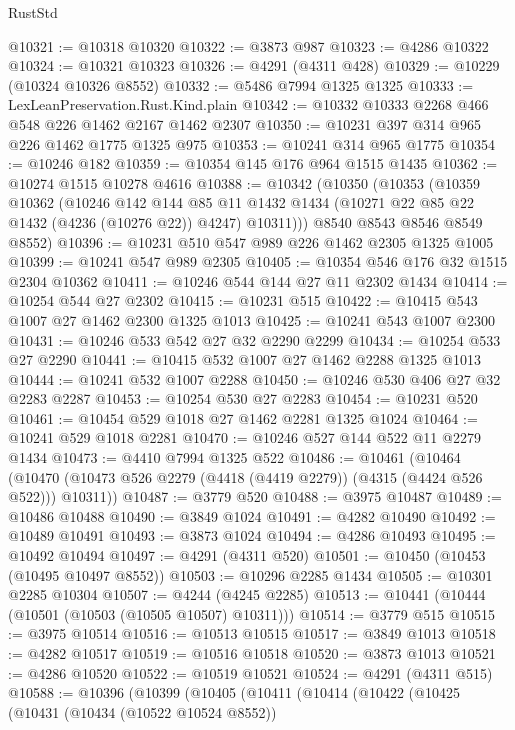 \begin{lexlean}{RustStd}
\begin{coremodule}
@10321 := @10318 @10320
@10322 := @3873 @987
@10323 := @4286 @10322
@10324 := @10321 @10323
@10326 := @4291 (@4311 @428)
@10329 := @10229 (@10324 @10326 @8552)
@10332 := @5486 @7994 @1325 @1325
@10333 := LexLeanPreservation.Rust.Kind.plain
@10342 := @10332 @10333 @2268 @466 @548 @226 @1462 @2167 @1462 @2307
@10350 := @10231 @397 @314 @965 @226 @1462 @1775 @1325 @975
@10353 := @10241 @314 @965 @1775
@10354 := @10246 @182
@10359 := @10354 @145 @176 @964 @1515 @1435
@10362 := @10274 @1515 @10278 @4616
@10388 := @10342
    (@10350
      (@10353
        (@10359
          @10362
          (@10246
            @142
            @144
            @85
            @11
            @1432
            @1434
            (@10271 @22 @85 @22 @1432 (@4236 (@10276 @22)) @4247)
            @10311)))
      @8540
      @8543
      @8546
      @8549
      @8552)
@10396 := @10231 @510 @547 @989 @226 @1462 @2305 @1325 @1005
@10399 := @10241 @547 @989 @2305
@10405 := @10354 @546 @176 @32 @1515 @2304 @10362
@10411 := @10246 @544 @144 @27 @11 @2302 @1434
@10414 := @10254 @544 @27 @2302
@10415 := @10231 @515
@10422 := @10415 @543 @1007 @27 @1462 @2300 @1325 @1013
@10425 := @10241 @543 @1007 @2300
@10431 := @10246 @533 @542 @27 @32 @2290 @2299
@10434 := @10254 @533 @27 @2290
@10441 := @10415 @532 @1007 @27 @1462 @2288 @1325 @1013
@10444 := @10241 @532 @1007 @2288
@10450 := @10246 @530 @406 @27 @32 @2283 @2287
@10453 := @10254 @530 @27 @2283
@10454 := @10231 @520
@10461 := @10454 @529 @1018 @27 @1462 @2281 @1325 @1024
@10464 := @10241 @529 @1018 @2281
@10470 := @10246 @527 @144 @522 @11 @2279 @1434
@10473 := @4410 @7994 @1325 @522
@10486 := @10461
    (@10464 (@10470 (@10473 @526 @2279 (@4418 (@4419 @2279)) (@4315 (@4424 @526 @522))) @10311))
@10487 := @3779 @520
@10488 := @3975 @10487
@10489 := @10486 @10488
@10490 := @3849 @1024
@10491 := @4282 @10490
@10492 := @10489 @10491
@10493 := @3873 @1024
@10494 := @4286 @10493
@10495 := @10492 @10494
@10497 := @4291 (@4311 @520)
@10501 := @10450 (@10453 (@10495 @10497 @8552))
@10503 := @10296 @2285 @1434
@10505 := @10301 @2285 @10304
@10507 := @4244 (@4245 @2285)
@10513 := @10441 (@10444 (@10501 (@10503 (@10505 @10507) @10311)))
@10514 := @3779 @515
@10515 := @3975 @10514
@10516 := @10513 @10515
@10517 := @3849 @1013
@10518 := @4282 @10517
@10519 := @10516 @10518
@10520 := @3873 @1013
@10521 := @4286 @10520
@10522 := @10519 @10521
@10524 := @4291 (@4311 @515)
@10588 := @10396
    (@10399
      (@10405
        (@10411
          (@10414
            (@10422
              (@10425
                (@10431
                  (@10434 (@10522 @10524 @8552))

\end{coremodule}
\end{lexlean}
